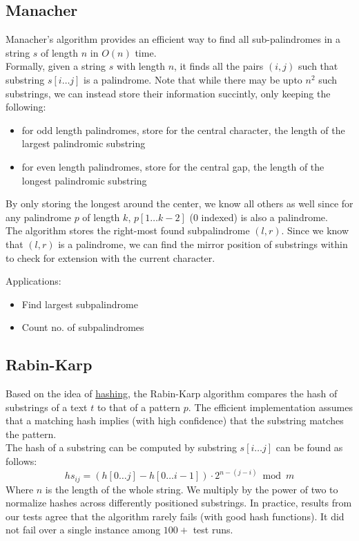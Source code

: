 \documentclass[12pt]{article}
\begin{document}
\subsection{Manacher\cite{manacher_cp}}
Manacher's algorithm provides an efficient way to find all sub-palindromes in a string $s$ of length $n$ in $O(n)$ time. \\
Formally, given a string $s$ with length $n$, it finds all the pairs $(i, j)$ such that substring $s[i \dots j]$ is a palindrome.
Note that while there may be upto $n^2$ such substrings, we can instead store their information succintly, only keeping the following:
\begin{itemize}
  \item for odd length palindromes, store for the central character, the length of the largest palindromic substring
  \item for even length palindromes, store for the central gap, the length of the longest palindromic substring
\end{itemize}
By only storing the longest around the center, we know all others as well since for any palindrome $p$ of length $k$, $p[1 \dots k - 2]$ ($0$ indexed) is also a palindrome. \\
The algorithm stores the right-most found subpalindrome $(l, r)$. Since we know that $(l, r)$ is a palindrome, we can find the mirror position of substrings within to check for extension with the current character.

Applications:
\begin{itemize}
  \item Find largest subpalindrome
  \item Count no. of subpalindromes
\end{itemize}

\subsection{Rabin-Karp\cite{rabin_karp_cp}}
Based on the idea of \hyperref[sec:hashing-algos-considered]{hashing}, the Rabin-Karp algorithm compares the hash of substrings of a text $t$ to that of a pattern $p$.  
The efficient implementation assumes that a matching hash implies (with high confidence) that the substring matches the pattern.  \\
The hash of a substring can be computed by substring $s[i \dots j]$ can be found as follows:
$$hs_{ij} = (h[0 \dots j] - h[0 \dots i - 1]) \cdot 2^{n - (j - i)} \bmod m$$
Where $n$ is the length of the whole string. We multiply by the power of two to normalize hashes across differently positioned substrings.
In practice, results from our tests agree that the algorithm rarely fails (with good hash functions).  
It did not fail over a single instance among $100+$ test runs.
\end{document}
